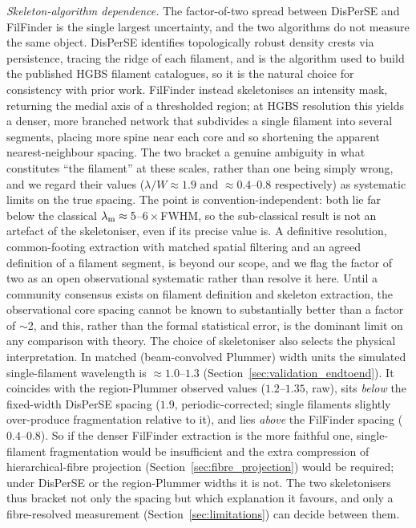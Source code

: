 \documentclass[usenatbib,twoside,twocolumn]{mnras}
\begin{document}
\emph{Skeleton-algorithm dependence.} The factor-of-two spread between DisPerSE and FilFinder is the single largest uncertainty, and the two algorithms do not measure the same object. DisPerSE identifies topologically robust density crests via persistence, tracing the ridge of each filament, and is the algorithm used to build the published HGBS filament catalogues, so it is the natural choice for consistency with prior work. FilFinder instead skeletonises an intensity mask, returning the medial axis of a thresholded region; at HGBS resolution this yields a denser, more branched network that subdivides a single filament into several segments, placing more spine near each core and so shortening the apparent nearest-neighbour spacing. The two bracket a genuine ambiguity in what constitutes ``the filament'' at these scales, rather than one being simply wrong, and we regard their values ($\lambda/W\approx1.9$ and $\approx0.4$--$0.8$ respectively) as systematic limits on the true spacing. The point is convention-independent: both lie far below the classical $\lambda_{\rm m}\approx5$--$6\times$FWHM, so the sub-classical result is not an artefact of the skeletoniser, even if its precise value is. A definitive resolution, common-footing extraction with matched spatial filtering and an agreed definition of a filament segment, is beyond our scope, and we flag the factor of two as an open observational systematic rather than resolve it here. Until a community consensus exists on filament definition and skeleton extraction, the observational core spacing cannot be known to substantially better than a factor of $\sim$2, and this, rather than the formal statistical error, is the dominant limit on any comparison with theory. The choice of skeletoniser also selects the physical interpretation. In matched (beam-convolved Plummer) width units the simulated single-filament wavelength is $\approx1.0$--$1.3$ (Section~\ref{sec:validation_endtoend}). It coincides with the region-Plummer observed values ($1.2$--$1.35$, raw), sits \emph{below} the fixed-width DisPerSE spacing ($1.9$, periodic-corrected; single filaments slightly over-produce fragmentation relative to it), and lies \emph{above} the FilFinder spacing ($0.4$--$0.8$). So if the denser FilFinder extraction is the more faithful one, single-filament fragmentation would be insufficient and the extra compression of hierarchical-fibre projection (Section~\ref{sec:fibre_projection}) would be required; under DisPerSE or the region-Plummer widths it is not. The two skeletonisers thus bracket not only the spacing but which explanation it favours, and only a fibre-resolved measurement (Section~\ref{sec:limitations}) can decide between them.
\end{document}
